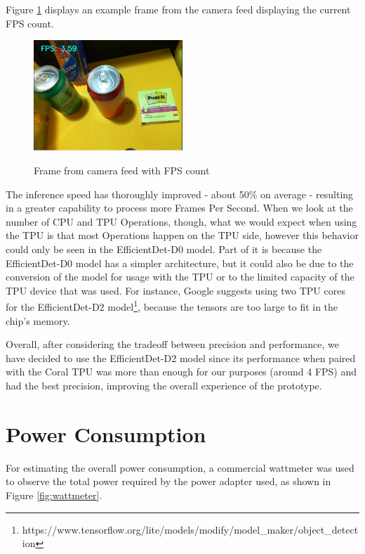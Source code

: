 Figure \ref{fig:framecount} displays an example frame from the camera feed displaying the 
current FPS count.

\begin{figure}[H]
	\centering
    \caption[Frame from camera feed with FPS count]{Frame from camera feed with FPS count}
	\includegraphics[width=0.5\textwidth]{./images/frameratemeasurement.png}
    \label{fig:framecount}
    \fonte{}
\end{figure}

The inference speed has thoroughly improved - about 50\% on average - resulting
in a greater capability to process more Frames Per Second. When we look at the
number of CPU and TPU Operations, though, what we would expect when using the
TPU is that most Operations happen on the TPU side, however this behavior could
only be seen in the EfficientDet-D0 model. Part of it is because the
EfficientDet-D0 model has a simpler architecture, but it could also be due to
the conversion of the model for usage with the TPU or to the limited capacity
of the TPU device that was used. For instance, Google suggests using two TPU
cores for the EfficientDet-D2
model\footnote{https://www.tensorflow.org/lite/models/modify/model\_maker/object\_detection},
because the tensors are too large to fit in the chip's memory.

Overall, after considering the tradeoff between precision and performance, we
have decided to use the EfficientDet-D2 model since its performance when paired
with the Coral TPU was more than enough for our purposes (around 4 FPS) and had
the best precision, improving the overall experience of the prototype.

\section{Power Consumption}

For estimating the overall power consumption, a commercial wattmeter was used
to observe the total power required by the power adapter used, as shown in
Figure \ref{fig:wattmeter}.

